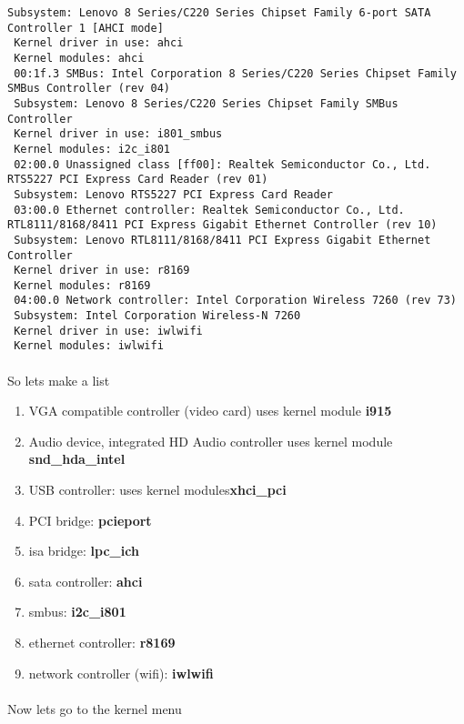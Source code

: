 \documentclass[10pt,a4paper]{article}
\begin{document}
\begin{lstlisting}[style=BashInputRoot]
 Subsystem: Lenovo 8 Series/C220 Series Chipset Family 6-port SATA Controller 1 [AHCI mode]
 Kernel driver in use: ahci
 Kernel modules: ahci
 00:1f.3 SMBus: Intel Corporation 8 Series/C220 Series Chipset Family SMBus Controller (rev 04)
 Subsystem: Lenovo 8 Series/C220 Series Chipset Family SMBus Controller
 Kernel driver in use: i801_smbus
 Kernel modules: i2c_i801
 02:00.0 Unassigned class [ff00]: Realtek Semiconductor Co., Ltd. RTS5227 PCI Express Card Reader (rev 01)
 Subsystem: Lenovo RTS5227 PCI Express Card Reader
 03:00.0 Ethernet controller: Realtek Semiconductor Co., Ltd. RTL8111/8168/8411 PCI Express Gigabit Ethernet Controller (rev 10)
 Subsystem: Lenovo RTL8111/8168/8411 PCI Express Gigabit Ethernet Controller
 Kernel driver in use: r8169
 Kernel modules: r8169
 04:00.0 Network controller: Intel Corporation Wireless 7260 (rev 73)
 Subsystem: Intel Corporation Wireless-N 7260
 Kernel driver in use: iwlwifi
 Kernel modules: iwlwifi
                \end{lstlisting}
                
                \paragraph{} So lets make a list
                \begin{enumerate}
                    \item VGA compatible controller (video card) uses kernel module \textbf{i915}
                    \item Audio device, integrated HD Audio controller uses kernel module \textbf{snd\_hda\_intel}
                    \item USB controller: uses kernel modules\textbf{xhci\_pci}
                    \item PCI bridge: \textbf{pcieport}
                    \item isa bridge: \textbf{lpc\_ich}
                    \item sata controller: \textbf{ahci}
                    \item smbus: \textbf{i2c\_i801}
                    \item ethernet controller: \textbf{r8169}
                    \item network controller (wifi): \textbf{iwlwifi}
                \end{enumerate}
                
                \paragraph{} Now lets go to the kernel menu
                
\end{document}
